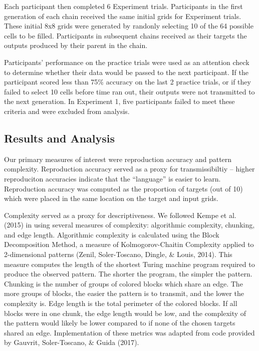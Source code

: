 \documentclass[10pt, letterpaper]{article}
\begin{document}
Each participant then completed 6 Experiment trials. Participants in the
first generation of each chain received the same initial grids for
Experiment trials. These initial 8x8 grids were generated by randonly
selecting 10 of the 64 possible cells to be filled. Participants in
subsequent chains received as their targets the outputs produced by
their parent in the chain.

Participants' performance on the practice trials were used as an
attention check to determine whether their data would be passed to the
next participant. If the participant scored less than 75\% accuracy on
the last 2 practice trials, or if they failed to select 10 cells before
time ran out, their outputs were not transmitted to the next generation.
In Experiment 1, five participants failed to meet these criteria and
were excluded from analysis.

\hypertarget{results-and-analysis}{%
\subsection{Results and Analysis}\label{results-and-analysis}}

Our primary measures of interest were reproduction accuracy and pattern
complexity. Reproduction accuracy served as a proxy for transmissibiltiy
-- higher reproduciton accuracies indicate that the ``language'' is
easier to learn. Reproduction accuracy was computed as the proportion of
targets (out of 10) which were placed in the same location on the target
and input grids.

Complexity served as a proxy for descriptiveness. We followed Kempe et
al. (2015) in using several measures of complexity: algorithmic
complexity, chunking, and edge length. Algorithmic complexity is
calculated using the Block Decomposition Method, a measure of
Kolmogorov-Chaitin Complexity applied to 2-dimensional patterns (Zenil,
Soler-Toscano, Dingle, \& Louis, 2014). This measure computes the length
of the shortest Turing machine program required to produce the observed
pattern. The shorter the program, the simpler the pattern. Chunking is
the number of groups of colored blocks which share an edge. The more
groups of blocks, the easier the pattern is to transmit, and the lower
the complexity is. Edge length is the total perimeter of the colored
blocks. If all blocks were in one chunk, the edge length would be low,
and the complexity of the pattern would likely be lower compared to if
none of the chosen targets shared an edge. Implementation of these
metrics was adapted from code provided by Gauvrit, Soler-Toscano, \&
Guida (2017).
\end{document}
